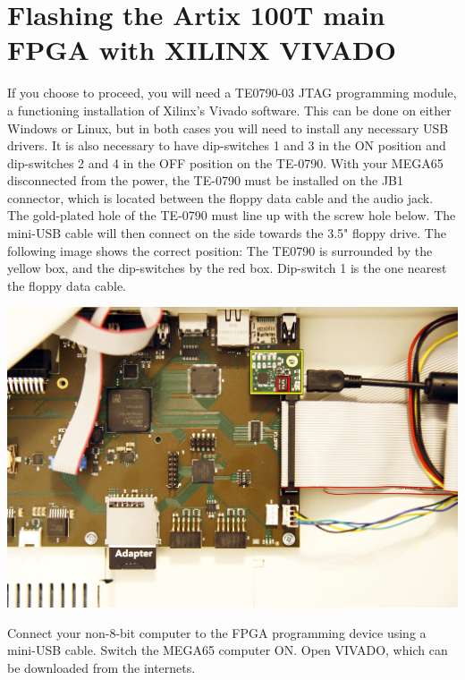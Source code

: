 \section{Flashing the Artix 100T main FPGA with XILINX VIVADO}

If you choose to proceed, you will need a TE0790-03 JTAG programming module, a functioning
installation of Xilinx's Vivado software.  This can be done on either Windows or Linux, but
in both cases you will need to install any necessary USB drivers. It is also necessary to have
dip-switches 1 and 3 in the ON position and dip-switches 2 and 4 in the OFF position on the TE-0790.
With your MEGA65 disconnected from the power, the TE-0790 must be installed on the JB1 connector,
which is located between the floppy data cable and the audio jack.
The gold-plated hole of the TE-0790 must line up with the screw
hole below.  The mini-USB cable will then connect on the side towards the 3.5" floppy drive.
The following image shows the correct position: The TE0790 is surrounded by the yellow box,
and the dip-switches by the red box. Dip-switch 1 is the one nearest the floppy data cable.


\includegraphics[width=\linewidth]{images/jtag_detail_02.jpg}


Connect your non-8-bit computer to the FPGA programming device using a mini-USB cable. Switch
the MEGA65 computer ON. Open VIVADO, which can be downloaded from the internets.

